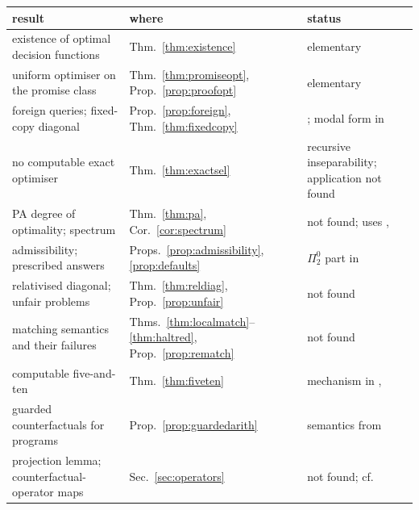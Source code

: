 \begin{table}[htbp]
  \centering\small
  \renewcommand{\arraystretch}{1.25}
  \setlength{\tabcolsep}{5pt}
  \label{tab:results2}
  \begin{tabularx}{\textwidth}{@{}>{\raggedright\arraybackslash}X
                                    >{\raggedright\arraybackslash}p{6.8em}
                                    >{\raggedright\arraybackslash}p{8.6em}@{}}
    \toprule
    result & where & status \\
    \midrule
    existence of optimal decision functions & Thm.~\ref{thm:existence} & elementary \\
    uniform optimiser on the promise class & Thm.~\ref{thm:promiseopt}, Prop.~\ref{prop:proofopt} & elementary \\
    foreign queries; fixed-copy diagonal & Prop.~\ref{prop:foreign}, Thm.~\ref{thm:fixedcopy} & \textcite{skalse2021}; modal form in \textcite{fallenstein2014evil} \\
    no computable exact optimiser & Thm.~\ref{thm:exactsel} & recursive inseparability; application not found \\
    PA degree of optimality; spectrum & Thm.~\ref{thm:pa}, Cor.~\ref{cor:spectrum} & not found; uses \textcite{scott1962}, \textcite{jockuschsoare1972trans} \\
    admissibility; prescribed answers & Props.~\ref{prop:admissibility}, \ref{prop:defaults} & $\Pi^0_2$ part in \textcite{kaminskikatoen2015} \\
    relativised diagonal; unfair problems & Thm.~\ref{thm:reldiag}, Prop.~\ref{prop:unfair} & not found \\
    matching semantics and their failures & Thms.~\ref{thm:localmatch}--\ref{thm:haltred}, Prop.~\ref{prop:rematch} & not found \\
    computable five-and-ten & Thm.~\ref{thm:fiveten} & mechanism in \textcite{slepnev2012}, \textcite{bensontilsen2014} \\
    guarded counterfactuals for programs & Prop.~\ref{prop:guardedarith} & semantics from \textcite{fallenstein2015third} \\
    projection lemma; counterfactual-operator maps & Sec.~\ref{sec:operators} & not found; cf.\ \textcite{williamson2015} \\
    \bottomrule
  \end{tabularx}
\end{table}

